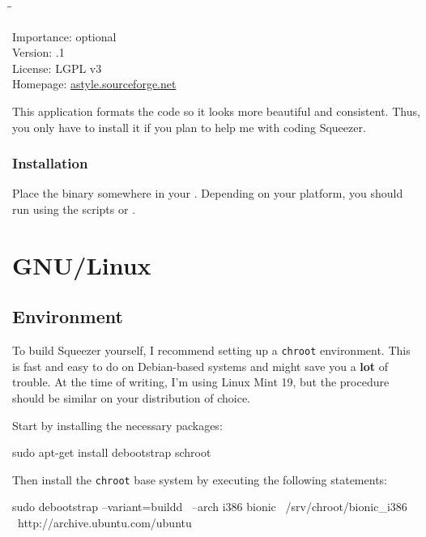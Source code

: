 \begin{tabbing}
  \hspace*{6em}\=\=\kill

  Importance:  \> optional \\
  Version:     .1 \\
  License:     \> LGPL v3 \\
  Homepage:    \> \href{http://astyle.sourceforge.net/}{astyle.sourceforge.net}
\end{tabbing}

This application formats the code so it looks more beautiful and
consistent.  Thus, you only have to install it if you plan to help me
with coding Squeezer.

\subsubsection{Installation}

Place the binary somewhere in your .  Depending on your
platform, you should run  using the scripts
 or .

\newpage %

\section{GNU/Linux}

\subsection{Environment}

To build Squeezer yourself, I recommend setting up a \texttt{chroot}
environment.  This is fast and easy to do on Debian-based systems and
might save you a \textbf{lot} of trouble.  At the time of writing, I'm
using Linux Mint 19, but the procedure should be similar on your
distribution of choice.

Start by installing the necessary packages:

\begin{VerbatimBoth}
  sudo apt-get install debootstrap schroot
\end{VerbatimBoth}

Then install the \texttt{chroot} base system by executing the
following statements:

\begin{Verbatim32}
  sudo debootstrap --variant=buildd \
    --arch i386 bionic \
    /srv/chroot/bionic_i386 \
    http://archive.ubuntu.com/ubuntu
\end{Verbatim32}

